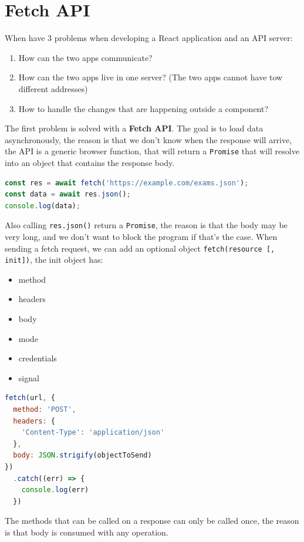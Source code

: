 \documentclass[12pt]{article}
\begin{document}
\section{Fetch API}
When have 3 problems when developing a React application and an API server:
\begin{enumerate}
  \item How can the two apps communicate?
  \item How can the two apps live in one server? (The two apps cannot have tow different addresses)
  \item How to handle the changes that are happening outside a component?
\end{enumerate}
The first problem is solved with a \textbf{Fetch API}. The goal is to load data asynchronously, the reason is that we don't know when the response will arrive, the API is a generic browser function, that will return a \texttt{Promise} that will resolve into an object that contains the response body.
\begin{lstlisting}[language=js]
const res = await fetch('https://example.com/exams.json');
const data = await res.json();
console.log(data);
\end{lstlisting}
Also calling \texttt{res.json()} return a \texttt{Promise}, the reason is that the body may be very long, and we don't want to block the program if that's the case. When sending a fetch request, we can add an optional object \texttt{fetch(resource [, init])}, the init object has:
\begin{itemize}
  \item method
  \item headers 
  \item body 
  \item mode 
  \item credentials 
  \item signal
\end{itemize}
\begin{lstlisting}[language=js]
fetch(url, {
  method: 'POST',
  headers: {
    'Content-Type': 'application/json'
  },
  body: JSON.strigify(objectToSend)
})
  .catch((err) => {
    console.log(err)
  })
\end{lstlisting}
The methods that can be called on a response can only be called once, the reason is that body is consumed with any operation.
\end{document}
